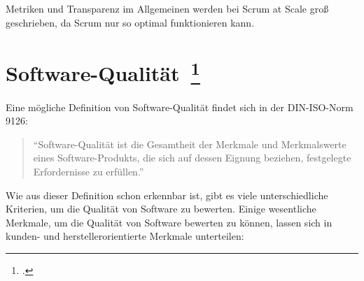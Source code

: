 Metriken und Transparenz im Allgemeinen werden bei Scrum at Scale groß geschrieben, da Scrum nur so optimal funktionieren kann.

\clearpage
\section[Software-Qualität]{Software-Qualität~\footcite[vgl.][Kapitel 1.2]{hoffmann_software_qualitat_2013}}

Eine mögliche Definition von Software-Qualität findet sich in der DIN-ISO-Norm 9126:

\begin{quote}
  ``Software-Qualität ist die Gesamtheit der Merkmale und Merkmalswerte eines Software-Produkts, die sich auf dessen Eignung beziehen, festgelegte Erfordernisse zu erfüllen.''
\end{quote}

Wie aus dieser Definition schon erkennbar ist, gibt es viele unterschiedliche Kriterien, um die Qualität von Software zu bewerten.
Einige wesentliche Merkmale, um die Qualität von Software bewerten zu können, lassen sich in kunden- und herstellerorientierte Merkmale unterteilen:

